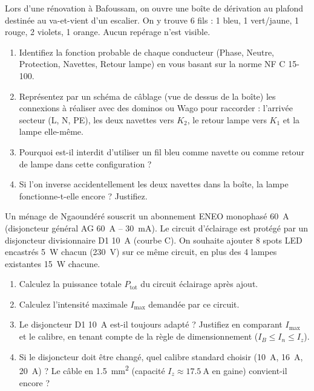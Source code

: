 \documentclass[11pt]{article}
\begin{document}
\begin{exercice}
Lors d'une rénovation à Bafoussam, on ouvre une boîte de dérivation au plafond destinée au va-et-vient d'un escalier. On y trouve 6 fils : 1 bleu, 1 vert/jaune, 1 rouge, 2 violets, 1 orange. Aucun repérage n'est visible.
\begin{enumerate}
    \item Identifiez la fonction probable de chaque conducteur (Phase, Neutre, Protection, Navettes, Retour lampe) en vous basant sur la norme NF C 15-100.
    \item Représentez par un schéma de câblage (vue de dessus de la boîte) les connexions à réaliser avec des dominos ou Wago pour raccorder : l'arrivée secteur (L, N, PE), les deux navettes vers $K_2$, le retour lampe vers $K_1$ et la lampe elle-même.
    \item Pourquoi est-il interdit d'utiliser un fil bleu comme navette ou comme retour de lampe dans cette configuration ?
    \item Si l'on inverse accidentellement les deux navettes dans la boîte, la lampe fonctionne-t-elle encore ? Justifiez.
\end{enumerate}
\end{exercice}

\begin{exercice}
Un ménage de Ngaoundéré souscrit un abonnement ENEO monophasé \SI{60}{\ampere} (disjoncteur général AG \SI{60}{\ampere} -- \SI{30}{\milli\ampere}). Le circuit d'éclairage est protégé par un disjoncteur divisionnaire D1 \SI{10}{\ampere} (courbe C). On souhaite ajouter 8 spots LED encastrés \SI{5}{\watt} chacun (\SI{230}{\volt}) sur ce même circuit, en plus des 4 lampes existantes \SI{15}{\watt} chacune.
\begin{enumerate}
    \item Calculez la puissance totale $P_{\text{tot}}$ du circuit éclairage après ajout.
    \item Calculez l'intensité maximale $I_{\text{max}}$ demandée par ce circuit.
    \item Le disjoncteur D1 \SI{10}{\ampere} est-il toujours adapté ? Justifiez en comparant $I_{\text{max}}$ et le calibre, en tenant compte de la règle de dimensionnement ($I_B \le I_n \le I_z$).
    \item Si le disjoncteur doit être changé, quel calibre standard choisir (\SI{10}{\ampere}, \SI{16}{\ampere}, \SI{20}{\ampere}) ? Le câble en \SI{1.5}{\mm^2} (capacité $I_z \approx \SI{17.5}{\ampere}$ en gaine) convient-il encore ?
\end{enumerate}
\end{exercice}
\end{document}
